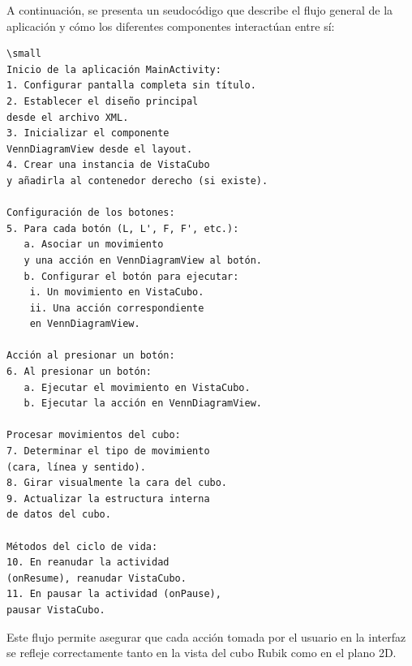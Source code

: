                                                                                                                                                                                                                                                                                                                                                                                                                                                                                                                                                                                                                                                                                                                                                                                                                                                                                                                                                                                                                                                                                                                                                                                                                                                                                                                                                                                                                                                                                                                                                                                                                                                                                                                                                                                                                                                                                                                                                                                                                                                                                                                                                                                                                                                                                                                                                                                                                                                                                                                                                                                                                                                                                                                                                                                                                                                                                                                                                                                                                                                                                                                                                                                                                                                                                                                                                                                                                                                                                                                                                                                                                                                                                                                                                                                                                                                                                                                                                                                                                                                                                                                                                                                                                                                                                                                                                                                                                                                                                                                                                                                                                                                                                                                                                                                                                                                                                                                                                                                                                                                                                                                                                                                                                                                                                                                                                                                                                                                                                                                                                                                                                                                                                                                                                                                                                                                                                                                                                                                                                                                                                                                                                                                                                                                                                                                                                                                                                                                                                                                                                                                                                                                                                                                                                                                                                                                                                                                                                                                                                                                                                                                                                                                                                                                                                                                                                                                                                                                                                                                                                                                                                                                                                                                                                                                                                                                                                                                                                                                                                                                                                                                                                                                                                                                                                                                                                                                                                                                                                                                                                                                                                                                                                                                                                                                                                                                                                                                                                                                                                                                                                                                                                                                                                                                                                                                                                                                                                                                                                                                                                                                                                                                                                                                                                                                                                                                                                                                                                                                                                                                                                                                                                                                                                                                                                                                                                                                                                                                                                                                                                                                                                                                                                                                                                                                                                                                                                                                                                                                                                                                                                                                                                                                                                                                                                                                                                                                                                                                                                                                                                                                                                                                                                                                                                                                                                                                                                                                                                                                                                                                                                                                                                                                                                                                                                                                                                                                                                                                                                                                                                                                                                                                                                                                                                                                                                                                                                                                                                                                                                                                                                                                                                                                                                                                                                                                                                                                                                                                                                                                                                                                                                                                                                                                                                                                                                                                                                                                                                                                                                                                                                                                                                                                                                                                                                                                                                                                                                                                                                                                                                                                                                                                                                                                                                                                                                                                                                                                                                                                                                                                                                                                                                                                                                                                                                                                                                                                                                                                                                                                                                                                                                                                                                                                                                                                                                                                                                                                                                                                                                                                                                                                                                                                                                                                                                                                                                                                                                                                                                                                                                                                                                                                                                                                                                                                                                                                                                                                                                                                                                                                                                                                                                                                                                                                                                                                                                                                                                                                                                                                                                                                                                                                                                                                                                                                                                                                                                                                                                                                                                                                                                                                                                                                                                                                                                                                                                                                                                                                                                                                                                                                                                                                                                                                                                                                                                                                                                                                                                                                                                                                                                                                                                                                                                                                                                                                                                                                                                                                                                                                                                                                                                                                                                                                                                                                                                                                                                                                                                                                                                                                                                                                                                                                                                                                                                                                                                                                                                                                                                                                                                                                                                                                                                                                                                                                                                                                                                                                                                                                                                                                                                                                                                                                                                                                                                                                                                                                                                                                                                                                                                                                                                                                                                                                                                                                                                                                                                                                                                                                                                                                                                                                                                                                                                                                                                                                                                                                                                                                                                                                                                                                                                                                                                                                                                                                                                                                                                                                                                                                                                                                                                                                                                                                                                                                                                                                                                                                                                                                                                                                                                                                                                                                                                                                                                                                                                                                                                                                                                                                                                                                                                                                                                                                                                                                                                                                                                                                                                                                                                                                                                                                                                                                                                                                                                                                                                                                                                                                                                                                                                                                                                                                                                                                                                                                                                                                                                                                                                                                                                                                                                                                                                                                                                                                                                                                                                                                                                                                                                                                                                                                                                                                                                                                                                                                                                                                                                                                                                                                                                                                                                                                                                                                                                                                                                                                                                                                                                                                                                                                                                                                                                                                                                                                                                                                                                                                                                                                                                                                                                                                                                                                                                                                                                                                                                                                                                                                                                                                                                                                                                                                                                                                                                                                                                                                                                                                                                                                                                                                                                                                                                                                                                                                                                                                                                                                                                                                                                                                                                                                                                                                                                                                                                                                                                                                                                                                                                                                                                                                                                                                                                                                                                                                                                                                                                                                                                                                                                                                                                                                                                                                                                                                                                                                                                                                                                                                                                                                                                                                                                                                                                                                                                                                                                                                                                                                                                                                                                                                                                                                                                                                                                                                                                                                                                                                                                                                                                                                                                                                                                                                                                                                                                                                                                                                                                                                                                                                                                                                                                                                                                                                                                                                                                                                                                                                                                                                                                                                                                                                                                                                                                                                                                                                                                                                                                                                                                                                                                                                                                                                                                                                                                                                                                                                                                                                                                                                                                                                                                                                                                                                                                                                                                                                                                                                                                                                                                                                                                                                                                                                                                                                                                                                                                                                                                                                                                                                                                                                                                                                                                                                                                                                                                                                                                                                                                                                                                                                                                                                                                                                                                                                                                                                                                                                                                                                                                                                                                                                                                                                                                                                                                                                                                                                                                                                                                                                                                                                                                                                                                                                                                                                                                                                                                                                                                                                                                                                                                                                                                                                                                                                                                                                                                                                                                                                                                                                                                                                                                                                                                                                                                                                                                                                                                                                                                                                                                                                                                                                                                                                                                                                                                                                                                                                                                                                                                                                                                                                                                                                                                                                                                                                                                                                                                                                                                                                                                                                                                                                                                                                                                                                                                                                                                                                                                                                                                                                                                                                                                                                                                                                                                                                                                                                                                                                                                                                                                                                                                                                                                                                                                                                                                                                                                                                                                                                                                                                                                                                                                                                                                                                                                                                                                                                                                                                                                                                                                                                                                                                                                                                                                                                                                                                                                                                                                                                                                                                                                                                                                                                                                                                                                                                                                                                                                                                                                                                                                                                                                                                                                                                                                                                                                                                                                                                                                                                                                                                                                                                                                                                                                                                                                                                                                                                                                                                                                                                                                                                                                                                                                                                                                                                                                                                                                                                                                                                                                                                                                                                                                                                                                                                                                                                                                                                                                                                                                                                                                                                                                                                                                                                                                                                                                                                                                                                                                                                                                                                                                                                                                                                                                                                                                                                                                                                                                                                                                                                                                                                                                                                                                                                                                                                                                                                                                                                                                                                                                                                                                                                                                                                                                                                                                                                                                                                                                                                                                                                                                                                                                                                                                                                                                                                                                                                                                                                                                                                                                                                                                                                                                                                                                                                                                                                                                                                                                                                                                                                                                                                                                                                                                                                                                                                                                                                                                                                                                                                                                                                                                                                                                                                                                                                \documentclass[conference]{IEEEtran}
\begin{document}
A continuación, se presenta un seudocódigo que describe el flujo general de la aplicación y cómo los diferentes componentes interactúan entre sí:

\begin{verbatim}
\small
Inicio de la aplicación MainActivity:
1. Configurar pantalla completa sin título.
2. Establecer el diseño principal 
desde el archivo XML.
3. Inicializar el componente
VennDiagramView desde el layout.
4. Crear una instancia de VistaCubo 
y añadirla al contenedor derecho (si existe).

Configuración de los botones:
5. Para cada botón (L, L', F, F', etc.):
   a. Asociar un movimiento 
   y una acción en VennDiagramView al botón.
   b. Configurar el botón para ejecutar:
    i. Un movimiento en VistaCubo.
    ii. Una acción correspondiente
    en VennDiagramView.

Acción al presionar un botón:
6. Al presionar un botón:
   a. Ejecutar el movimiento en VistaCubo.
   b. Ejecutar la acción en VennDiagramView.

Procesar movimientos del cubo:
7. Determinar el tipo de movimiento 
(cara, línea y sentido).
8. Girar visualmente la cara del cubo.
9. Actualizar la estructura interna
de datos del cubo.

Métodos del ciclo de vida:
10. En reanudar la actividad 
(onResume), reanudar VistaCubo.
11. En pausar la actividad (onPause),
pausar VistaCubo.
\end{verbatim}

Este flujo permite asegurar que cada acción tomada por el usuario en la interfaz se refleje correctamente tanto en la vista del cubo Rubik como en el plano 2D.
\end{document}
